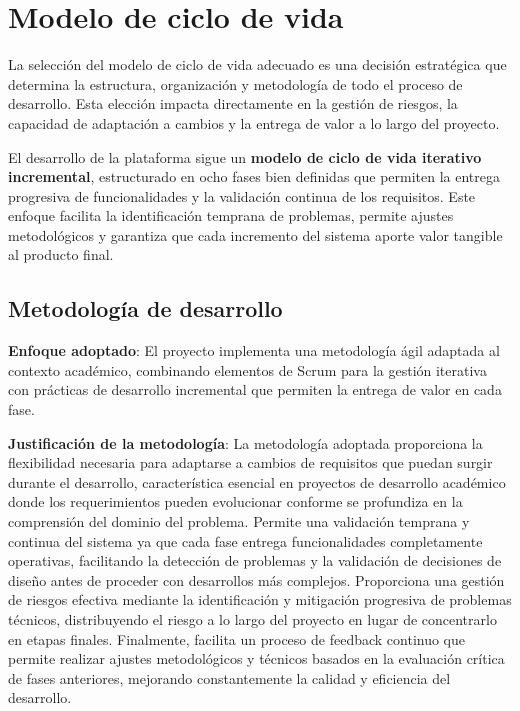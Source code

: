 \documentclass[12pt,a4paper,oneside]{report}
\begin{document}
\section{Modelo de ciclo de vida}\label{modelo-de-ciclo-de-vida}

La selección del modelo de ciclo de vida adecuado es una decisión
estratégica que determina la estructura, organización y metodología de
todo el proceso de desarrollo. Esta elección impacta directamente en la
gestión de riesgos, la capacidad de adaptación a cambios y la entrega de
valor a lo largo del proyecto.

El desarrollo de la plataforma sigue un \textbf{modelo de ciclo de vida
iterativo incremental}, estructurado en ocho fases bien definidas que
permiten la entrega progresiva de funcionalidades y la validación
continua de los requisitos. Este enfoque facilita la identificación
temprana de problemas, permite ajustes metodológicos y garantiza que
cada incremento del sistema aporte valor tangible al producto final.

\subsection{Metodología de
desarrollo}\label{metodologuxeda-de-desarrollo}

\textbf{Enfoque adoptado}: El proyecto implementa una metodología ágil
adaptada al contexto académico, combinando elementos de Scrum para la
gestión iterativa con prácticas de desarrollo incremental que permiten
la entrega de valor en cada fase.

\textbf{Justificación de la metodología}: La metodología adoptada proporciona la flexibilidad necesaria para adaptarse a cambios de requisitos que puedan surgir durante el desarrollo, característica esencial en proyectos de desarrollo académico donde los requerimientos pueden evolucionar conforme se profundiza en la comprensión del dominio del problema. Permite una validación temprana y continua del sistema ya que cada fase entrega funcionalidades completamente operativas, facilitando la detección de problemas y la validación de decisiones de diseño antes de proceder con desarrollos más complejos. Proporciona una gestión de riesgos efectiva mediante la identificación y mitigación progresiva de problemas técnicos, distribuyendo el riesgo a lo largo del proyecto en lugar de concentrarlo en etapas finales. Finalmente, facilita un proceso de feedback continuo que permite realizar ajustes metodológicos y técnicos basados en la evaluación crítica de fases anteriores, mejorando constantemente la calidad y eficiencia del desarrollo.
\end{document}
